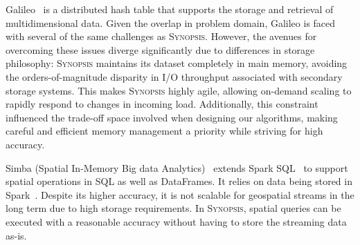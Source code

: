 \documentclass[9pt,journal,compsoc]{IEEEtran}
\begin{document}
Galileo~\cite{malensek2016analytic,malensek2015fast} is a distributed hash table that supports the storage and retrieval of multidimensional data. Given the overlap in problem domain, Galileo is faced with several of the same challenges as \textsc{Synopsis}. However, the avenues for overcoming these issues diverge significantly due to differences in storage philosophy: \textsc{Synopsis} maintains its dataset completely in main memory, avoiding the orders-of-magnitude disparity in I/O throughput associated with secondary storage systems. This makes \textsc{Synopsis} highly agile, allowing on-demand scaling to rapidly respond to changes in incoming load. Additionally, this constraint influenced the trade-off space involved when designing our algorithms, making careful and efficient memory management a priority while striving for high accuracy.

Simba (Spatial In-Memory Big data Analytics)~\cite{xiesimba} extends Spark SQL~\cite{armbrust2015spark} to support spatial operations in SQL as well as DataFrames. It relies on data being stored in Spark~\cite{zaharia2010spark}. Despite its higher accuracy, it is not scalable for geospatial streams in the long term due to high storage requirements. In \textsc{Synopsis}, spatial queries can be executed with a reasonable accuracy without having to store the streaming data as-is.
\end{document}
